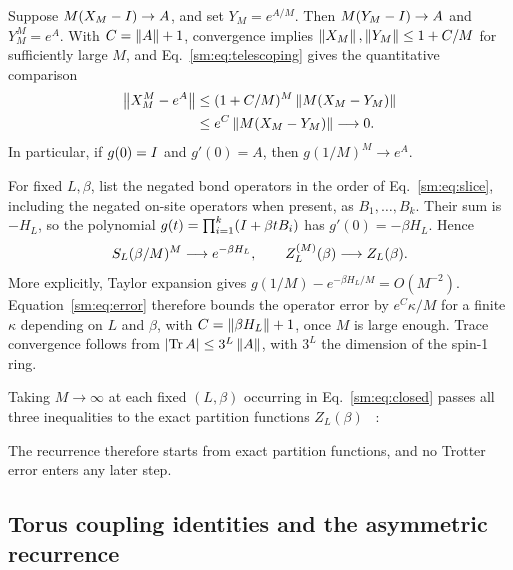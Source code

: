 Suppose $M(X_M-I)\to A$, and set $Y_M=e^{A/M}$.
Then $M(Y_M-I)\to A$ and $Y_M^M=e^A$.
With $C=\left\lVert A\right\rVert+1$, convergence implies
$\left\lVert X_M\right\rVert,\left\lVert Y_M\right\rVert\le1+C/M$ for sufficiently large $M$, and
Eq.~\eqref{sm:eq:telescoping} gives the quantitative comparison
\begin{align}
    \left\lVert X_M^M-e^A\right\rVert
     &\le (1+C/M)^M\left\lVert M(X_M-Y_M)\right\rVert \notag\\
     &\le e^C\left\lVert M(X_M-Y_M)\right\rVert\longrightarrow0.
    \label{sm:eq:error}
\end{align}
In particular, if $g(0)=I$ and $g'(0)=A$, then
$g(1/M)^M\to e^A$.

For fixed $L,\beta$, list the negated bond operators in the order
of Eq.~\eqref{sm:eq:slice}, including the negated on-site operators
when present, as $B_1,\ldots,B_k$.
Their sum is $-H_L$, so the polynomial
$g(t)=\prod_{i=1}^k(I+\beta tB_i)$ has $g'(0)=-\beta H_L$. Hence%
~
\begin{equation}
    S_L(\beta/M)^M\longrightarrow e^{-\beta H_L},
    \qquad Z_{L}^{(M)}(\beta)\longrightarrow Z_L(\beta).
    \label{sm:eq:limit}
\end{equation}
More explicitly, Taylor expansion gives
$g(1/M)-e^{-\beta H_L/M}=O(M^{-2})$.
Equation~\eqref{sm:eq:error} therefore bounds the operator error by
$e^C\kappa/M$ for a finite $\kappa$ depending on $L$ and $\beta$, with
$C=\left\lVert \beta H_L\right\rVert+1$, once $M$ is large enough.
Trace convergence follows from
$\lvert\operatorname{Tr} A\rvert\le3^L\left\lVert A\right\rVert$, with $3^L$ the dimension of the
spin-1 ring.

Taking $M\to\infty$ at each fixed $(L,\beta)$ occurring in
Eq.~\eqref{sm:eq:closed} passes all three inequalities to the exact
partition functions $Z_L(\beta)$%
~:
\begin{proofdiagram}
    \limitfirst
\end{proofdiagram}
The recurrence therefore starts from exact partition functions, and no
Trotter error enters any later step.

\subsection{Torus coupling identities and the asymmetric recurrence}
\label{sm:sec:asymmetric}

